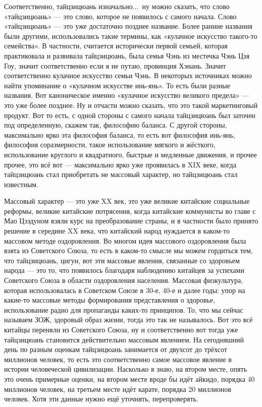 Соответственно, тайцзицюань изначально...\ ну можно 
сказать, что слово «тайцзицюань» --- это слово, которое не появилось с самого начала. Слово
«тайцзицюань» --- это уже достаточно позднее название. Более ранние названия были другими, 
использовались такие термины, как «кулачное искусство такого-то семейства». В частности,
считается исторически первой семьей, которая практиковала и развивала тайцзицюань, была 
семья Чэнь из местечка Чэнь Цзя Гоу, значит соответственно если я не путаю, провинция Хэнань.
Значит соответственно кулачное искусство семьи Чэнь. В некоторых источниках можно найти 
упоминание о «кулачном искусстве инь-янь». То есть были разные названия. Вот каноническое именно 
«кулачное искусство великого предела» --- это уже более позднее. Ну и отчасти можно сказать, что 
это такой маркетинговый продукт. Вот то есть, с одной стороны с самого начала тайцзицюань был 
заточен под определенную, скажем так, философию баланса. С другой стороны, максимально ярко 
эта философия баланса, то есть вот философия инь-янь, философия соразмерности, такое 
использование мягкого и жёсткого, использование круглого и квадратного, быстрые и медленные 
движения, и прочее прочее, это всё вот --- максимально ярко уже проявилась в XIX веке, когда
тайцзицюань стал приобретать не массовый характер, но тайцзицюань стал известным.

Массовый 
характер --- это уже XX век, это уже великие китайские социальные реформы, великие китайские 
потрясения, когда китайские коммунисты во главе с Мао Цзэдуном взяли курс на преобразование 
страны, и в частности было принято решение в середине XX века, что китайский народ нуждается в 
каком-то массовом методе оздоровления. Во многом идея массового оздоровления была взята из 
Советского Союза, то есть в каком-то смысле мы можем гордиться тем, что тайцзицюань, цигун, вот 
эти массовые явления, связанные со здоровьем народа --- это то, что появилось благодаря 
наблюдению китайцев за успехами Советского Союза в области оздоровления населения. 
Массовая физкультура, которая использовалась в Советском Союзе в 30-е, 40-е и далее годы: упор на 
какие-то массовые методы формирования представления о здоровье, использование радио для 
пропаганды каких-то принципов. То, что мы сейчас называем ЗОЖ, здоровый образ жизни, тогда 
это так не называлось. Вот это всё китайцы переняли из Советского Союза, ну и соответственно 
вот тогда уже тайцзицюань становится действительно массовым явлением. На сегодняшний день по 
разным оценкам тайцзицюань занимается от двухсот до трёхсот миллионов человек, то есть это 
соответственно самое массовое явление в истории человеческой цивилизации. Насколько я 
знаю, на втором месте, опять это очень примерные оценки, на втором месте вроде бы идёт айкидо, 
порядка 40 миллионов человек, на третьем месте идёт карате, порядка 20 миллионов человек. Хотя 
эти данные нужно ещё уточнять, перепроверять.

